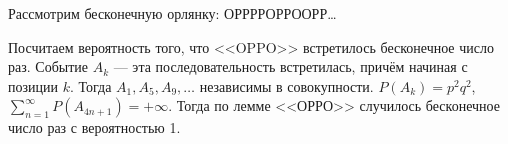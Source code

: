  \begin{example}
     Рассмотрим бесконечную орлянку: ОРРРРОРРООРР\ldots

     Посчитаем вероятность того, что <<OPPO>> встретилось бесконечное число раз. Событие $A_k$ --- эта последовательность встретилась, причём начиная с позиции $k$. Тогда $A_1, A_5, A_9, \ldots$ независимы в совокупности.
     $P(A_k) = p^2q^2$, $\sum_{n = 1}^\infty P(A_{4n+1}) = +\infty$. Тогда по лемме <<ОРРО>> случилось бесконечное число раз с вероятностью 1.
 \end{example}


